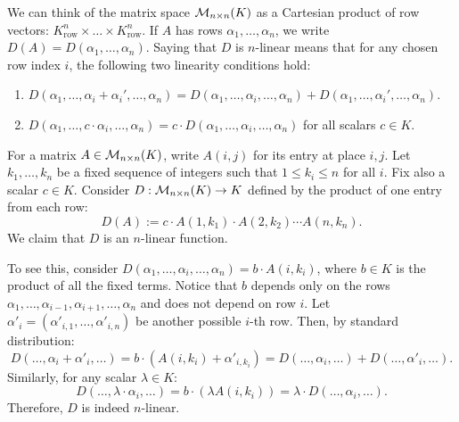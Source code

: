 We can think of the matrix space $\mathcal{M}_{n \times n}(K)$ as a Cartesian product of row vectors: $K^n_{\text{row}} \times \dots \times K^n_{\text{row}}$. If $A$ has rows $\alpha_1, \dots, \alpha_n$, we write $D(A) = D(\alpha_1, \dots, \alpha_n)$.
Saying that $D$ is $n$-linear means that for any chosen row index $i$, the following two linearity conditions hold:
\begin{enumerate}
  \item $D(\alpha_1, \dots, \alpha_i + \alpha_i', \dots, \alpha_n) = D(\alpha_1, \dots, \alpha_i, \dots, \alpha_n) + D(\alpha_1, \dots, \alpha_i', \dots, \alpha_n)$.
  \item $D(\alpha_1, \dots, c \cdot \alpha_i, \dots, \alpha_n) = c \cdot D(\alpha_1, \dots, \alpha_i, \dots, \alpha_n)$ for all scalars $c \in K$.
\end{enumerate}

\begin{example}\label{ex:n_linear_product}
  For a matrix $A \in \mathcal{M}_{n \times n}(K)$, write $A(i,j)$ for its entry at place $i,j$. Let $k_1, \dots, k_n$ be a fixed sequence of integers such that $1 \le k_i \le n$ for all $i$. Fix also a scalar $c \in K$. Consider $D : \mathcal{M}_{n \times n}(K) \to K$ defined by the product of one entry from each row:
  \[
  D(A) := c \cdot A(1, k_1) \cdot A(2, k_2) \cdots A(n, k_n).
  \]
  We claim that $D$ is an $n$-linear function.

  To see this, consider $D(\alpha_1, \dots, \alpha_i, \dots, \alpha_n) = b \cdot A(i, k_i)$, where $b \in K$ is the product of all the fixed terms. Notice that $b$ depends only on the rows $\alpha_1, \dots, \alpha_{i-1}, \alpha_{i+1}, \dots, \alpha_n$ and does not depend on row $i$.
  Let $\alpha'_i = (\alpha'_{i,1}, \dots, \alpha'_{i,n})$ be another possible $i$-th row. Then, by standard distribution:
  \[
  D(\dots, \alpha_i + \alpha'_i, \dots) = b \cdot (A(i, k_i) + \alpha'_{i, k_i}) = D(\dots, \alpha_i, \dots) + D(\dots, \alpha'_i, \dots).
  \]
  Similarly, for any scalar $\lambda \in K$:
  \[
  D(\dots, \lambda \cdot \alpha_i, \dots) = b \cdot (\lambda A(i, k_i)) = \lambda \cdot D(\dots, \alpha_i, \dots).
  \]
  Therefore, $D$ is indeed $n$-linear.
\end{example}

